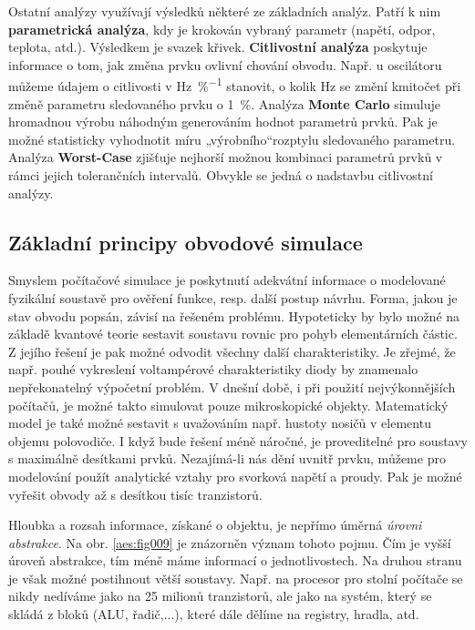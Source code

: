       Ostatní analýzy využívají výsledků některé ze základních analýz. Patří k nim
      \textbf{parametrická analýza}, kdy je krokován vybraný parametr (napětí, odpor, teplota,
      atd.). Výsledkem je svazek křivek. \textbf{Citlivostní analýza} poskytuje informace o tom, jak
      změna prvku ovlivní chování obvodu. Např. u oscilátoru můžeme údajem o citlivosti v
      \unit{\Hz\per\percent} stanovit, o kolik \unit{\Hz} se změní kmitočet při změně parametru
      sledovaného prvku o \qty{1}{\percent}. Analýza \textbf{Monte Carlo} simuluje hromadnou výrobu
      náhodným generováním hodnot parametrů prvků. Pak je možné statisticky vyhodnotit míru
      „výrobního“rozptylu sledovaného parametru. Analýza \textbf{Worst-Case} zjišťuje nejhorší
      možnou kombinaci parametrů prvků v rámci jejich tolerančních intervalů. Obvykle se jedná o
      nadstavbu citlivostní analýzy.

      \subsection{Základní principy obvodové simulace}
        Smyslem počítačové simulace je poskytnutí adekvátní informace o modelované fyzikální
        soustavě pro ověření funkce, resp. další postup návrhu. Forma, jakou je stav obvodu popsán,
        závisí na řešeném problému. Hypoteticky by bylo možné na základě kvantové teorie sestavit
        soustavu rovnic pro pohyb elementárních částic. Z jejího řešení je pak možné odvodit všechny
        další charakteristiky. Je zřejmé, že např. pouhé vykreslení voltampérové charakteristiky
        diody by znamenalo nepřekonatelný výpočetní problém. V dnešní době, i při použití
        nejvýkonnějších počítačů, je možné takto simulovat pouze mikroskopické objekty. Matematický
        model je také možné sestavit s uvažováním např. hustoty nosičů v elementu objemu polovodiče.
        I když bude řešení méně náročné, je proveditelné pro soustavy s maximálně desítkami prvků.
        Nezajímá-li nás dění uvnitř prvku, můžeme pro modelování použít analytické vztahy pro
        svorková napětí a proudy. Pak je možné vyřešit obvody až s desítkou tisíc tranzistorů.


        Hloubka a rozsah informace, získané o objektu, je nepřímo úměrná \emph{úrovni abstrakce}. Na
        obr. \ref{aes:fig009} je znázorněn význam tohoto pojmu. Čím je vyšší úroveň abstrakce, tím
        méně máme informací o jednotlivostech. Na druhou stranu je však možné postihnout větší
        soustavy. Např. na procesor pro stolní počítače se nikdy nedíváme jako na 25 milionů
        tranzistorů, ale jako na systém, který se skládá z bloků (ALU, řadič,...), které dále dělíme
        na registry, hradla, atd. 
        
